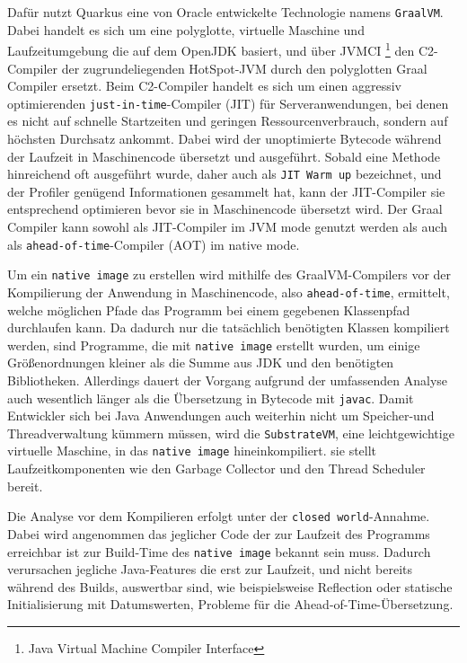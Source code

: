 Dafür nutzt Quarkus eine von Oracle entwickelte Technologie namens \verb|GraalVM|.
Dabei handelt es sich um eine polyglotte, virtuelle Maschine und Laufzeitumgebung die auf dem OpenJDK basiert, und über
JVMCI \footnote{Java Virtual Machine Compiler Interface} den C2-Compiler der zugrundeliegenden HotSpot-JVM durch den
polyglotten Graal Compiler ersetzt.\parencite{GraalVM}
Beim C2-Compiler handelt es sich um einen aggressiv optimierenden \verb|just-in-time|-Compiler (JIT) für Serveranwendungen, bei denen es nicht auf
schnelle Startzeiten und geringen Ressourcenverbrauch, sondern auf höchsten Durchsatz ankommt.
Dabei wird der unoptimierte Bytecode während der Laufzeit in Maschinencode übersetzt und ausgeführt. Sobald eine Methode hinreichend oft
ausgeführt wurde, daher auch als \verb|JIT Warm up| bezeichnet, und der Profiler genügend Informationen gesammelt hat, kann der JIT-Compiler
sie entsprechend optimieren bevor sie in Maschinencode übersetzt wird.
Der Graal Compiler kann sowohl als JIT-Compiler im JVM mode genutzt werden als auch als \verb|ahead-of-time|-Compiler (AOT) im native mode.\newline

Um ein \verb|native image| zu erstellen wird mithilfe des GraalVM-Compilers vor der Kompilierung der Anwendung in Maschinencode, also \verb|ahead-of-time|,
ermittelt, welche möglichen Pfade das Programm bei einem gegebenen Klassenpfad durchlaufen kann. Da dadurch nur die tatsächlich benötigten Klassen
kompiliert werden, sind Programme, die mit \verb|native image| erstellt wurden, um einige Größenordnungen kleiner als die Summe aus
JDK und den benötigten Bibliotheken.
Allerdings dauert der Vorgang aufgrund der umfassenden Analyse auch wesentlich länger als die Übersetzung in Bytecode mit \verb|javac|.
Damit Entwickler sich bei Java Anwendungen auch weiterhin nicht um Speicher-und Threadverwaltung kümmern müssen, wird die \verb|SubstrateVM|, eine
leichtgewichtige virtuelle Maschine, in das \verb|native image| hineinkompiliert.
sie stellt Laufzeitkomponenten wie den Garbage Collector und den Thread Scheduler bereit.

Die Analyse vor dem Kompilieren erfolgt unter der \verb|closed world|-Annahme. Dabei wird angenommen das jeglicher Code der zur Laufzeit des Programms
erreichbar ist zur Build-Time des \verb|native image| bekannt sein muss. Dadurch verursachen jegliche Java-Features die erst zur Laufzeit,
und nicht bereits während des Builds,
auswertbar sind, wie beispielsweise Reflection oder statische Initialisierung mit Datumswerten, Probleme für die Ahead-of-Time-Übersetzung.

